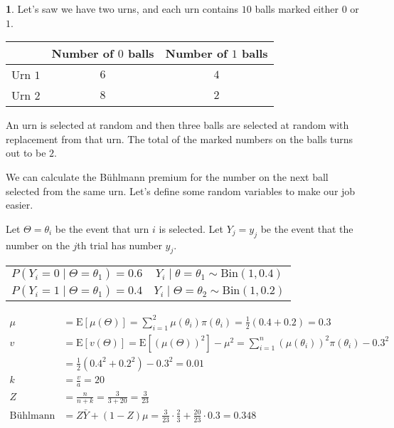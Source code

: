 \documentclass[english,12pt]{article}
\theoremstyle{plain}
\theoremstyle{definition}
\newtheorem*{example}{\protect\examplename}
\theoremstyle{definition} %
\providecommand{\examplename}{Example}
\newcommand{\ex}[1]{\mbox{E} \left[ #1 \right]}
\begin{document}
\begin{example}
Let's saw we have two urns, and each urn contains $10$ balls marked either $0$ or $1$.

\begin{center}
\begin{tabular}{|c|c|c|}
\hline
&Number of $0$ balls & Number of $1$ balls\\
\hline
Urn $1$ & $6$ & $4$\\
Urn $2$ & $8$ & $2$
\end{tabular}
\end{center}

An urn is selected at random and then three balls are selected at random with replacement from that urn.  The total of the marked numbers on the balls turns out to be $2$.

We can calculate the B\"{u}hlmann premium for the number on the next ball selected from the same urn.  Let's define some random variables to make our job easier.

Let $\Theta=\theta_i$ be the event that urn $i$ is selected.
Let $Y_j=y_j$ be the event that the number on the $j$th trial has number $y_j$.

\begin{center}
\begin{tabular}{cc}
$P(Y_i=0\mid\Theta=\theta_1)=0.6$ & $Y_i\mid\theta=\theta_1\sim \text{Bin}(1,0.4)$\\
$P(Y_i=1\mid\Theta=\theta_1)=0.4$ & $Y_i\mid\Theta=\theta_2\sim\text{Bin}(1,0.2)$
\end{tabular}
\end{center}

\begin{align*}
\mu&=\ex{\mu(\Theta)}
=\sum_{i=1}^2\mu(\theta_i)\pi(\theta_i)
=\frac{1}{2}(0.4+0.2)
=0.3\\
v&=\ex{v(\Theta)}
=\ex{(\mu(\Theta))^2}-\mu^2
=\sum_{i=1}^n(\mu(\theta_i))^2\pi(\theta_i)-0.3^2\\
&=\frac{1}{2}(0.4^2+0.2^2)-0.3^2=0.01\\
k&=\frac{v}{a}
=20\\
Z&=\frac{n}{n+k}
=\frac{3}{3+20}
=\frac{3}{23}\\
\text{B\"{u}hlmann premium}&=Z\bar{Y}+(1-Z)\mu
=\frac{3}{23}\cdot\frac{2}{3}+\frac{20}{23}\cdot 0.3
=0.348
\end{align*}
\end{example}
\end{document}
